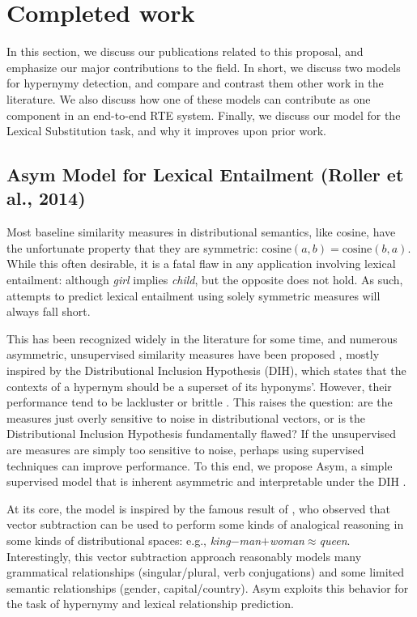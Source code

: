 \documentclass[12pt]{article}
\begin{document}
\pagebreak
\section{Completed work}

In this section, we discuss our publications related to this
proposal, and emphasize our major contributions to the field. In short, we
discuss two models for hypernymy detection, and compare and contrast them other
work in the literature. We also discuss how one of these models can contribute
as one component in an end-to-end RTE system. Finally, we discuss our model for
the Lexical Substitution task, and why it improves upon prior work.

\subsection{Asym Model for Lexical Entailment (Roller et al., 2014)}
\label{sec:asym}

Most baseline similarity measures in distributional semantics, like cosine,
have the unfortunate property that they are symmetric: $\text{cosine}(a, b) =
\text{cosine}(b, a)$. While this often desirable, it
is a fatal flaw in any application involving lexical entailment: although {\em
girl} implies {\em child}, but the opposite does not hold. As such, attempts to
predict lexical entailment using solely symmetric measures will always fall
short.

This has been recognized widely in the
literature for some time, and numerous asymmetric, unsupervised similarity measures have been
proposed
\cite{weeds:2003:emnlp,zhitomirsky-geffet:2005:acl,clarke:2009:gems,kotlerman:2010:nle,santus:2013:thesis},
mostly inspired by the Distributional Inclusion Hypothesis (DIH), which
states that the contexts of a hypernym should be a superset of its hyponyms'.
However, their
performance tend to be lackluster \cite{clarke:2009:gems} or brittle
\cite{kotlerman:2010:nle}. This raises the question: are the measures just
overly sensitive to noise in distributional vectors, or is the Distributional
Inclusion Hypothesis fundamentally flawed? If the unsupervised are measures
are simply too sensitive to noise, perhaps using supervised techniques can
improve performance.  To this end, we propose Asym, a simple supervised model
that is inherent asymmetric and interpretable under the DIH
\cite{roller:2014:coling}. 

At its core, the model is inspired by the famous result of
, who observed that vector subtraction can be used
to perform some kinds of analogical reasoning in some kinds of distributional
spaces: e.g., {\em king}$ - ${\em man}$ + ${\em woman}$ \approx ${\em queen}.
Interestingly, this vector subtraction approach reasonably models many
grammatical relationships (singular/plural, verb conjugations) and some limited
semantic relationships (gender, capital/country). Asym exploits this
behavior for the task of hypernymy and lexical relationship prediction.
\end{document}
